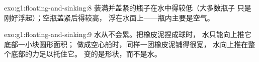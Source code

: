 \begin{solution}{exo:g1:floating-and-sinking:8}
装满并盖紧的瓶子在水中得较低（大多数瓶子
只是刚好浮起）；空瓶盖紧后得较高，
浮在水面上——瓶内主要是空气。
\end{solution}

\begin{solution}{exo:g1:floating-and-sinking:9}
水从不会累。把橡皮泥捏成球时，
水只能向上推它底部一小块圆形面积；
做成空心船时，同样一团橡皮泥铺得很宽，
水向上推在整个底部的力足以托住它。
变的是形状，而不是水。
\end{solution}
